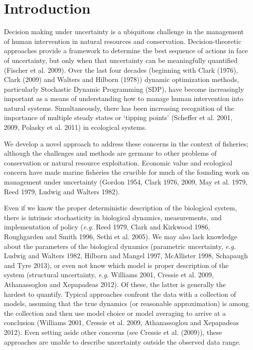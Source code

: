 \documentclass[author-year, 12pt,review]{components/elsarticle} %
\begin{document}
\section{Introduction}\label{introduction}

Decision making under uncertainty is a ubiquitous challenge in the
management of human intervention in natural resources and conservation.
Decision-theoretic approaches provide a framework to determine the best
sequence of actions in face of uncertainty, but only when that
uncertainty can be meaningfully quantified (Fischer et al. 2009). Over
the last four decades (beginning with Clark (1976), Clark (2009) and
Walters and Hilborn (1978)) dynamic optimization methods, particularly
Stochastic Dynamic Programming (SDP), have become increasingly important
as a means of understanding how to manage human intervention into
natural systems. Simultaneously, there has been increasing recognition
of the importance of multiple steady states or `tipping points'
(Scheffer et al. 2001, 2009, Polasky et al. 2011) in ecological systems.

We develop a novel approach to address these concerns in the context of
fisheries; although the challenges and methods are germane to other
problems of conservation or natural resource exploitation. Economic
value and ecological concern have made marine fisheries the crucible for
much of the founding work on management under uncertainty (Gordon 1954,
Clark 1976, 2009, May et al. 1979, Reed 1979, Ludwig and Walters 1982).

Even if we know the proper deterministic description of the biological
system, there is intrinsic stochasticity in biological dynamics,
measurements, and implementation of policy (\emph{e.g.} Reed 1979, Clark
and Kirkwood 1986, Roughgarden and Smith 1996, Sethi et al. 2005). We
may also lack knowledge about the parameters of the biological dynamics
(parametric uncertainty, \emph{e.g.} Ludwig and Walters 1982, Hilborn
and Mangel 1997, McAllister 1998, Schapaugh and Tyre 2013), or even not
know which model is proper description of the system (structural
uncertainty, \emph{e.g.} Williams 2001, Cressie et al. 2009,
Athanassoglou and Xepapadeas 2012). Of these, the latter is generally
the hardest to quantify. Typical approaches confront the data with a
collection of models, assuming that the true dynamics (or reasonable
approximation) is among the collection and then use model choice or
model averaging to arrive at a conclusion (Williams 2001, Cressie et al.
2009, Athanassoglou and Xepapadeas 2012). Even setting aside other
concerns (see Cressie et al. (2009)), these approaches are unable to
describe uncertainty outside the observed data range.
\end{document}
